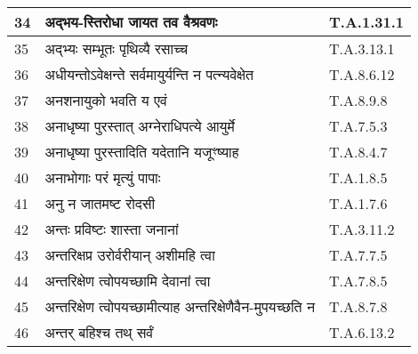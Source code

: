 \documentclass[17pt]{extarticle}
\begin{document}
\begin{longtable}{||p{0.4in}||p{4.9in}||p{0.9in}||}
    34 & अद्भय{-}स्तिरोधा जायत तव वैश्रवणः & T.A.1.31.1       \\
    
    \hline
        
    35 & अद्भ्यः सम्भूतः पृथिव्यै रसाच्च & T.A.3.13.1       \\
    
    \hline
        
    36 & अधीयन्तोऽवेक्षन्ते सर्वमायुर्यन्ति न पत्न्यवेक्षेत & T.A.8.6.12       \\
    
    \hline
        
    37 & अनशनायुको भवति य एवं & T.A.8.9.8       \\
    
    \hline
        
    38 & अनाधृष्या पुरस्तात् अग्नेराधिपत्ये आयुर्मे & T.A.7.5.3       \\
    
    \hline
        
    39 & अनाधृष्या पुरस्तादिति यदेतानि यजूꣳष्याह & T.A.8.4.7       \\
    
    \hline
        
    40 & अनाभोगाः परं मृत्युं पापाः & T.A.1.8.5       \\
    
    \hline
        
    41 & अनु न जातमष्ट रोदसी & T.A.1.7.6       \\
    
    \hline
        
    42 & अन्तः प्रविष्टः शास्ता जनानां & T.A.3.11.2       \\
    
    \hline
        
    43 & अन्तरिक्षप्र उरोर्वरीयान् अशीमहि त्वा & T.A.7.7.5       \\
    
    \hline
        
    44 & अन्तरिक्षेण त्वोपयच्छामि देवानां त्वा & T.A.7.8.5       \\
    
    \hline
        
    45 & अन्तरिक्षेण त्वोपयच्छामीत्याह अन्तरिक्षेणैवैन{-}मुपयच्छति न & T.A.8.7.8       \\
    
    \hline
        
    46 & अन्तर् बहिश्च तथ् सर्वं & T.A.6.13.2       \\
    

\end{longtable}
\end{document}
